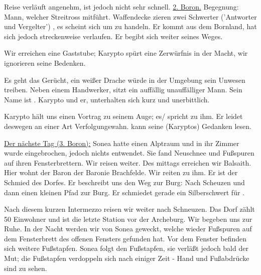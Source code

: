 Reise verläuft angenehm, ist jedoch nicht sehr schnell.
\underline{2. Boron.}
Begegnung: Mann, welcher Streitross mitführt. Waffendecke zieren zwei Schwerter ('Antworter und Vergelter') , es scheint sich um  zu handeln. Er kommt aus dem Bornland, hat sich jedoch streckenweise verlaufen. Er begibt sich weiter seines Weges.

Wir erreichen eine Gaststube; Karypto spürt eine Zerwürfnis in der Macht, wir ignorieren seine Bedenken.

Es geht das Gerücht, ein weißer Drache würde in der Umgebung sein Unwesen treiben.
Neben einem Handwerker, sitzt ein auffällig unauffälliger Mann. Sein Name ist . Karypto und er, unterhalten sich kurz und unerbittlich.

Karypto hält uns einen Vortrag zu seinem Auge; es/ spricht zu ihm. Er leidet deswegen an einer Art Verfolgungswahn.  kann seine (Karyptos) Gedanken lesen.

\underline{Der nächste Tag (3. Boron):}
Sonea hatte einen Alptraum und in ihr Zimmer wurde eingebrochen, jedoch nichts entwendet. Sie fand Neuschnee und Fußspuren auf ihren Fensterbrettern. Wir reisen weiter. Des mittags erreichen wir Balsaith. Hier wohnt der Baron der Baronie Brachfelde. Wir reiten zu ihm. Er ist der Schmied des Dorfes. Er beschreibt uns den Weg zur Burg: Nach Scheuzen und dann einen kleinen Pfad zur Burg. Er schmiedet gerade ein Silberschwert für .


Nach diesem kurzen Intermezzo reisen wir weiter nach Schneuzen. Das Dorf zählt 50 Einwohner und ist die letzte Station vor der Archeburg. Wir begeben uns zur Ruhe. In der Nacht werden wir von Sonea geweckt, welche wieder Fußspuren auf dem Fensterbrett des offenen Fensters gefunden hat. Vor dem Fenster befinden sich weitere Fußstapfen. Sonea folgt den Fußstapfen, sie verläßt jedoch bald der Mut; die Fußstapfen verdoppeln sich nach einiger Zeit - Hand und Fußabdrücke sind zu sehen. 


